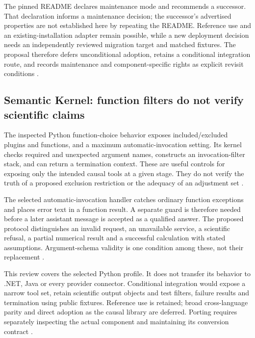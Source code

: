 The pinned README declares maintenance mode and recommends a successor.
That declaration informs a maintenance decision; the successor's advertised
properties are not established here by repeating the README. Reference
use and an existing-installation adapter remain possible, while a new
deployment decision needs an independently reviewed migration target and
matched fixtures. The proposal therefore defers unconditional adoption,
retains a conditional integration route, and records maintenance and
component-specific rights as explicit revisit conditions
\citep{v12_la04_autogen,exec24_framework_contracts}.

\subsection{Semantic Kernel: function filters do not verify scientific claims}
The inspected Python function-choice behavior exposes included/excluded
plugins and functions, and a maximum automatic-invocation setting. Its
kernel checks required and unexpected argument names, constructs an
invocation-filter stack, and can return a termination context. These are
useful controls for exposing only the intended causal tools at a given
stage. They do not verify the truth of a proposed exclusion restriction
or the adequacy of an adjustment set
\citep{exec24_framework_semantic_kernel}.

The selected automatic-invocation handler catches ordinary function
exceptions and places error text in a function result. A separate guard
is therefore needed before a later assistant message is accepted as a
qualified answer. The proposed protocol distinguishes an invalid request,
an unavailable service, a scientific refusal, a partial numerical result
and a successful calculation with stated assumptions. Argument-schema
validity is one condition among these, not their replacement
\citep{exec24_framework_semantic_kernel,exec24_framework_contracts}.

This review covers the selected Python profile. It does not transfer its
behavior to .NET, Java or every provider connector. Conditional integration
would expose a narrow tool set, retain scientific output objects and
test filters, failure results and termination using public fixtures.
Reference use is retained; broad cross-language parity and direct adoption
as the causal library are deferred. Porting requires separately inspecting
the actual component and maintaining its conversion contract
\citep{exec24_framework_contracts}.

